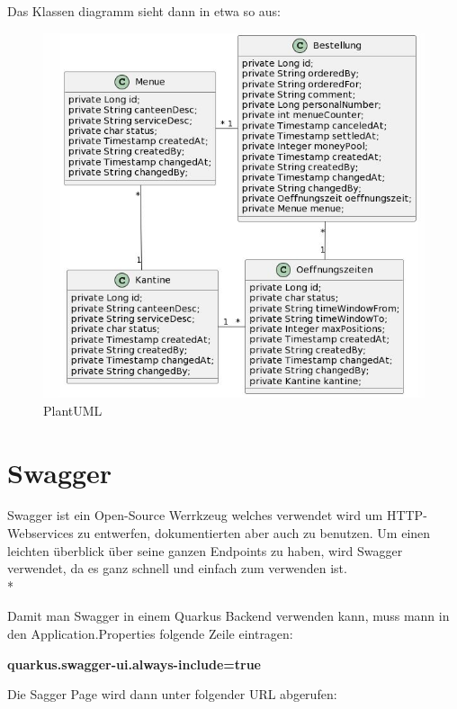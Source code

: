 Das Klassen diagramm sieht dann in etwa so aus:

\begin{figure}[htp]
    \author{David Ignjatovic}
    \centering
    \includegraphics[scale=0.60]{pics/plantuml.jpg}
    \caption{PlantUML}
    \label{fig:impl:plantuml}
\end{figure}



\pagebreak

\section{Swagger}
\author{David Ignjatovic} 

Swagger ist ein Open-Source Werrkzeug welches verwendet wird um HTTP-Webservices zu entwerfen, dokumentierten aber auch zu benutzen. Um einen leichten überblick über seine 
ganzen Endpoints zu haben, wird Swagger verwendet, da es ganz schnell und einfach zum verwenden ist. \\*

Damit man Swagger in einem Quarkus Backend verwenden kann, muss mann in den Application.Properties folgende Zeile eintragen:

\textbf{quarkus.swagger-ui.always-include=true}

Die Sagger Page wird dann unter folgender URL abgerufen: 

